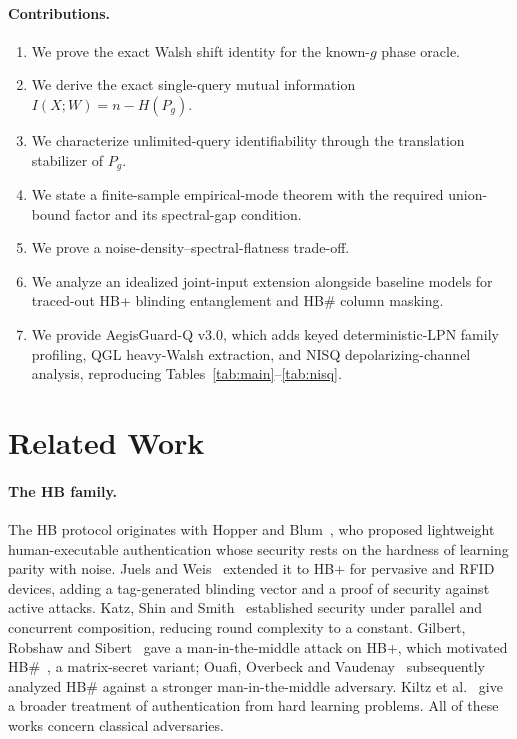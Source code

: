 \documentclass[10pt,twocolumn]{article}
\theoremstyle{definition}
\begin{document}
\paragraph{Contributions.}
\begin{enumerate}\itemsep0.1em
\item We prove the exact Walsh shift identity for the known-$g$ phase oracle.
\item We derive the exact single-query mutual information $I(X;W) = n - H(P_g)$.
\item We characterize unlimited-query identifiability through the translation stabilizer of $P_g$.
\item We state a finite-sample empirical-mode theorem with the required union-bound factor and its spectral-gap condition.
\item We prove a noise-density--spectral-flatness trade-off.
\item We analyze an idealized joint-input extension alongside baseline models for traced-out HB+ blinding entanglement and HB\# column masking.
\item We provide AegisGuard-Q v3.0, which adds keyed deterministic-LPN family profiling, QGL heavy-Walsh extraction, and NISQ depolarizing-channel analysis, reproducing Tables~\ref{tab:main}--\ref{tab:nisq}.
\end{enumerate}

\section{Related Work}\label{sec:related}

\paragraph{The HB family.} The HB protocol originates with Hopper and
Blum~\cite{hopper2001}, who proposed lightweight human-executable
authentication whose security rests on the hardness of learning parity with
noise. Juels and Weis~\cite{juels2005} extended it to HB+ for pervasive and
RFID devices, adding a tag-generated blinding vector and a proof of security
against active attacks. Katz, Shin and Smith~\cite{katz2010} established
security under parallel and concurrent composition, reducing round complexity
to a constant. Gilbert, Robshaw and Sibert~\cite{gilbert2005} gave a
man-in-the-middle attack on HB+, which motivated HB\#~\cite{gilbert2008}, a
matrix-secret variant; Ouafi, Overbeck and Vaudenay~\cite{ouafi2008}
subsequently analyzed HB\# against a stronger man-in-the-middle adversary.
Kiltz et al.~\cite{kiltz2011} give a broader treatment of authentication from
hard learning problems. All of these works concern classical adversaries.
\end{document}
